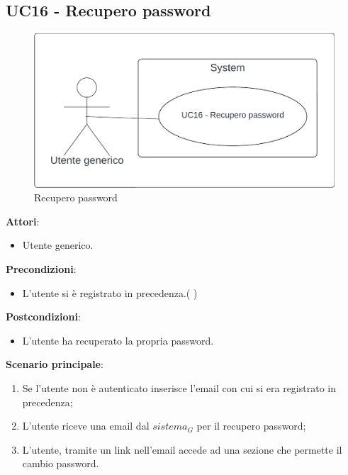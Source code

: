 \subsection{UC16 - Recupero password} \label{usecase:16}
\begin{figure}[H]
    \centering
    \includegraphics[width=0.8\linewidth]{ucd/ucd16.png}
    \caption{Recupero password}
\end{figure}
\textbf{Attori}:
\begin{itemize}
   \item Utente generico.
\end{itemize}
\textbf{Precondizioni}:
\begin{itemize}
    \item L'utente si è registrato in precedenza.( )
\end{itemize}
\textbf{Postcondizioni}:
\begin{itemize}
    \item L'utente ha recuperato la propria password.
\end{itemize}
\textbf{Scenario principale}:
\begin{enumerate}
    \item Se l'utente non è autenticato inserisce l'email con cui si era registrato in precedenza;
    \item L'utente riceve una email dal $\textit{sistema}_G$ per il recupero password;
    \item L'utente, tramite un link nell'email accede ad una sezione che permette il cambio password.
\end{enumerate}
\newpage